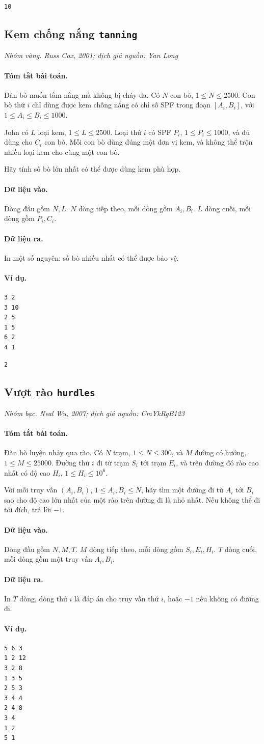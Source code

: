 \documentclass[11pt]{article}
\newcommand{\problem}[4]{%
  \subsection[#1 (#2)]{#1 \hfill {\normalsize\texttt{#2}}}%
  \noindent\textit{#3. #4}\par\smallskip
}
\newcommand{\iosec}[1]{\paragraph{#1}}
\begin{document}
\begin{verbatim}
10
\end{verbatim}

\problem{Kem chống nắng}{tanning}{Nhóm vàng}{Russ Cox, 2001; dịch giả nguồn: Yan Long}

\iosec{Tóm tắt bài toán.}
Đàn bò muốn tắm nắng mà không bị cháy da. Có \(N\) con bò,
\(1\le N\le 2500\). Con bò thứ \(i\) chỉ dùng được kem chống nắng có chỉ số
SPF trong đoạn \([A_i,B_i]\), với \(1\le A_i\le B_i\le 1000\).

John có \(L\) loại kem, \(1\le L\le 2500\). Loại thứ \(i\) có SPF \(P_i\),
\(1\le P_i\le 1000\), và đủ dùng cho \(C_i\) con bò. Mỗi con bò dùng đúng
một đơn vị kem, và không thể trộn nhiều loại kem cho cùng một con bò.

Hãy tính số bò lớn nhất có thể được dùng kem phù hợp.

\iosec{Dữ liệu vào.}
Dòng đầu gồm \(N,L\). \(N\) dòng tiếp theo, mỗi dòng gồm \(A_i,B_i\). \(L\)
dòng cuối, mỗi dòng gồm \(P_i,C_i\).

\iosec{Dữ liệu ra.}
In một số nguyên: số bò nhiều nhất có thể được bảo vệ.

\iosec{Ví dụ.}
\begin{verbatim}
3 2
3 10
2 5
1 5
6 2
4 1
\end{verbatim}

\begin{verbatim}
2
\end{verbatim}

\problem{Vượt rào}{hurdles}{Nhóm bạc}{Neal Wu, 2007; dịch giả nguồn: CmYkRgB123}

\iosec{Tóm tắt bài toán.}
Đàn bò luyện nhảy qua rào. Có \(N\) trạm, \(1\le N\le 300\), và \(M\) đường
có hướng, \(1\le M\le 25000\). Đường thứ \(i\) đi từ trạm \(S_i\) tới trạm
\(E_i\), và trên đường đó rào cao nhất có độ cao \(H_i\),
\(1\le H_i\le 10^6\).

Với mỗi truy vấn \((A_i,B_i)\), \(1\le A_i,B_i\le N\), hãy tìm một đường đi
từ \(A_i\) tới \(B_i\) sao cho độ cao lớn nhất của một rào trên đường đi là
nhỏ nhất. Nếu không thể đi tới đích, trả lời \(-1\).

\iosec{Dữ liệu vào.}
Dòng đầu gồm \(N,M,T\). \(M\) dòng tiếp theo, mỗi dòng gồm \(S_i,E_i,H_i\).
\(T\) dòng cuối, mỗi dòng gồm một truy vấn \(A_i,B_i\).

\iosec{Dữ liệu ra.}
In \(T\) dòng, dòng thứ \(i\) là đáp án cho truy vấn thứ \(i\), hoặc \(-1\)
nếu không có đường đi.

\iosec{Ví dụ.}
\begin{verbatim}
5 6 3
1 2 12
3 2 8
1 3 5
2 5 3
3 4 4
2 4 8
3 4
1 2
5 1
\end{verbatim}
\end{document}
